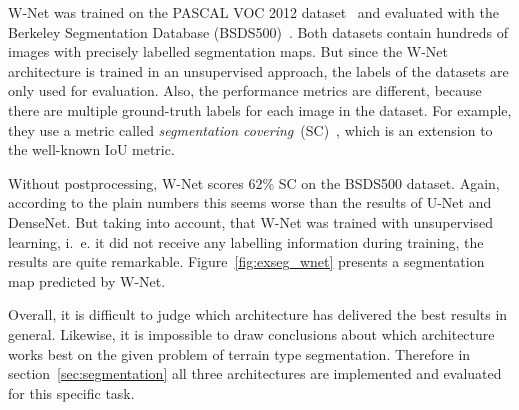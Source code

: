 W-Net was trained on the PASCAL VOC 2012 dataset~\cite{pascal_voc10} and evaluated with the Berkeley Segmentation Database (BSDS500)~\cite{hierarchy_imgseg11}. Both datasets contain hundreds of images with precisely labelled segmentation maps. But since the W-Net architecture is trained in an unsupervised approach, the labels of the datasets are only used for evaluation. Also, the performance metrics are different, because there are multiple ground-truth labels for each image in the dataset. For example, they use a metric called \emph{segmentation covering}~(SC)~\cite{hierarchy_imgseg11}, which is an extension to the well-known IoU metric.

Without postprocessing, W-Net scores $62\%$ SC on the BSDS500 dataset. Again, according to the plain numbers this seems worse than the results of U-Net and DenseNet. But taking into account, that W-Net was trained with unsupervised learning, i.~e. it did not receive any labelling information during training, the results are quite remarkable. Figure~\ref{fig:exseg_wnet} presents a segmentation map predicted by W-Net.

Overall, it is difficult to judge which architecture has delivered the best results in general. Likewise, it is impossible to draw conclusions about which architecture works best on the given problem of terrain type segmentation. Therefore in section~\ref{sec:segmentation} all three architectures are implemented and evaluated for this specific task.

\clearpage